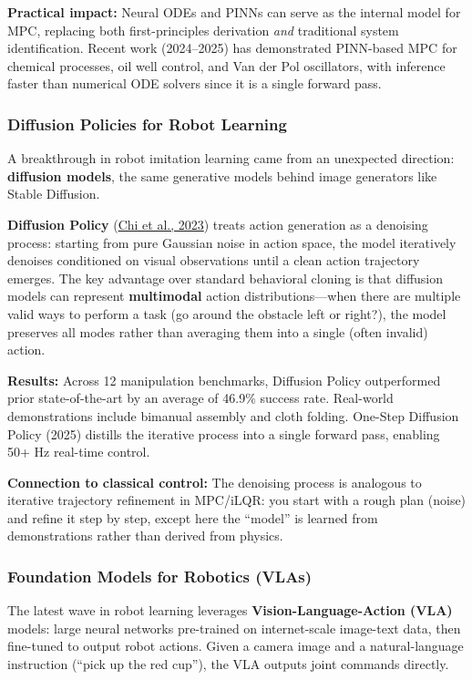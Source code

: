 \textbf{Practical impact:} Neural ODEs and PINNs can serve as the internal model for MPC, replacing both first-principles derivation \emph{and} traditional system identification. Recent work (2024--2025) has demonstrated PINN-based MPC for chemical processes, oil well control, and Van der Pol oscillators, with inference faster than numerical ODE solvers since it is a single forward pass.

\subsubsection{Diffusion Policies for Robot Learning}

A breakthrough in robot imitation learning came from an unexpected direction: \textbf{diffusion models}, the same generative models behind image generators like Stable Diffusion.

\textbf{Diffusion Policy} (\href{https://arxiv.org/abs/2303.04137}{Chi et al., 2023}) treats action generation as a denoising process: starting from pure Gaussian noise in action space, the model iteratively denoises conditioned on visual observations until a clean action trajectory emerges. The key advantage over standard behavioral cloning is that diffusion models can represent \textbf{multimodal} action distributions---when there are multiple valid ways to perform a task (go around the obstacle left or right?), the model preserves all modes rather than averaging them into a single (often invalid) action.

\textbf{Results:} Across 12 manipulation benchmarks, Diffusion Policy outperformed prior state-of-the-art by an average of 46.9\% success rate. Real-world demonstrations include bimanual assembly and cloth folding. One-Step Diffusion Policy (2025) distills the iterative process into a single forward pass, enabling 50+ Hz real-time control.

\textbf{Connection to classical control:} The denoising process is analogous to iterative trajectory refinement in MPC/iLQR: you start with a rough plan (noise) and refine it step by step, except here the ``model'' is learned from demonstrations rather than derived from physics.

\subsubsection{Foundation Models for Robotics (VLAs)}

The latest wave in robot learning leverages \textbf{Vision-Language-Action (VLA)} models: large neural networks pre-trained on internet-scale image-text data, then fine-tuned to output robot actions. Given a camera image and a natural-language instruction (``pick up the red cup''), the VLA outputs joint commands directly.

